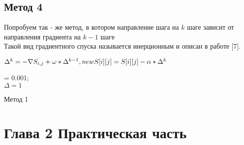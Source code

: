 \documentclass[ 12pt,x11names]{article}
\begin{document}
    \subsection{Метод 4}
    Попробуем так - же метод, в котором направление шага на $k$ шаге зависит от направления градиента на $k - 1$ шаге\\
    Такой вид градиентного спуска называется инерционным и описан в работе [7].
    \\
      \begin{center}
     $\Delta^k = -\nabla S_{i, j} + \omega * \Delta ^  {k-1} , \\
		            newS[i][j] = S[i][j] - \alpha * \Delta^k $\\
     \end{center}
    \begin{algorithm}[H]
		\SetAlgoLined
		\alpha = 0.001;\\
		$ \Delta  = 1$\\
	\caption{Метод 1}
    \end{algorithm}
    \newpage
    \section{
    Глава 2
    Практическая часть}
\end{document}

